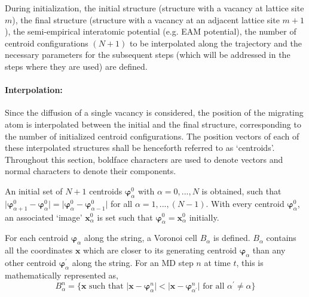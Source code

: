 \documentclass{article}
\begin{document}
During initialization, the initial structure (structure with a vacancy at lattice site $m$), the final structure (structure with a vacancy at an adjacent lattice site $m+1$), the semi-empirical interatomic potential (e.g. EAM potential), the number of centroid configurations $(N + 1)$ to be interpolated along the trajectory and the necessary parameters for the subsequent steps (which will be addressed in the steps where they are used) are defined. 

\paragraph*{Interpolation:}

Since the diffusion of a single vacancy is considered, the position of the migrating atom is interpolated between the initial and the final structure, corresponding to the number of initialized centroid configurations. The position vectors of each of these interpolated structures shall be henceforth referred to as \enquote*{centroids}. Throughout this section, boldface characters are used to denote vectors and normal characters to denote their components.

An initial set of $N + 1$ centroids $\bm{\varphi}_{\alpha}^0$ with $\alpha=0,...,N$ is obtained, such that $\mathopen|\bm{\varphi}_{\alpha + 1}^0 - \bm{\varphi}_{\alpha}^0\mathclose| = \mathopen|\bm{\varphi}_{\alpha}^0 - \bm{\varphi}_{\alpha - 1}^0\mathclose|$ for all $\alpha=1,...,(N -1)$. With every centroid $\bm{\varphi}_{\alpha}^0$, an associated \enquote*{image} $\bm{x}_{\alpha}^0$ is set such that $\bm{\varphi}_{\alpha}^0 = \bm{x}_{\alpha}^0$ initially.

For each centroid $\bm{\varphi}_{\alpha}$ along the string, a Voronoi cell $B_{\alpha}$ is defined. $B_{\alpha}$ contains all the coordinates $\bm{x}$ which are closer to its generating centroid $\bm{\varphi}_{\alpha}$ than any other centroid $\bm{\varphi}_{\alpha}^{\prime}$ along the string. For an MD step $n$ at time $t$, this is mathematically represented as,
%
\begin{equation} \label{eq:12}
B_{\alpha}^n = \{\bm{x} \text{ such that } \mathopen|\bm{x} - \bm{\varphi}_{\alpha}^n\mathclose| < \mathopen|\bm{x} - \bm{\varphi}_{\alpha^\prime}^n\mathclose| \text{ for all } \alpha^{\prime} \ne \alpha \}
\end{equation}
%
\end{document}
